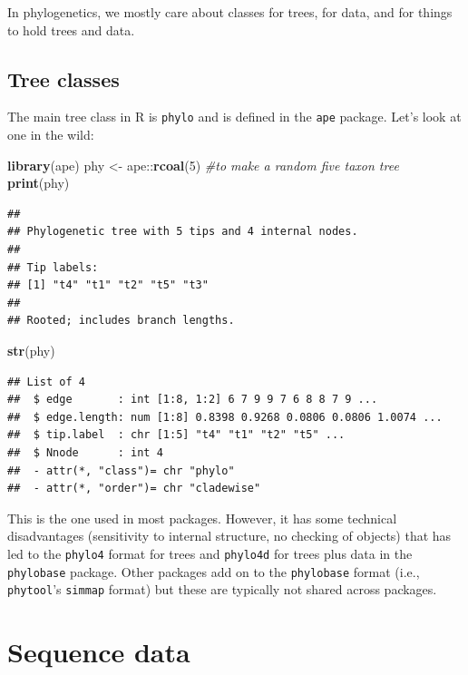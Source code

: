 \documentclass[]{book}
\newenvironment{Shaded}{\begin{snugshade}}{\end{snugshade}}
\newcommand{\KeywordTok}[1]{\textcolor[rgb]{0.13,0.29,0.53}{\textbf{{#1}}}}
\newcommand{\DecValTok}[1]{\textcolor[rgb]{0.00,0.00,0.81}{{#1}}}
\newcommand{\StringTok}[1]{\textcolor[rgb]{0.31,0.60,0.02}{{#1}}}
\newcommand{\CommentTok}[1]{\textcolor[rgb]{0.56,0.35,0.01}{\textit{{#1}}}}
\newcommand{\NormalTok}[1]{{#1}}
\theoremstyle{definition}
\theoremstyle{definition}
\theoremstyle{remark}
\begin{document}
In phylogenetics, we mostly care about classes for trees, for data, and
for things to hold trees and data.

\subsection{Tree classes}\label{tree-classes}

The main tree class in R is \texttt{phylo} and is defined in the
\texttt{ape} package. Let's look at one in the wild:

\begin{Shaded}
\begin{Highlighting}[]
\KeywordTok{library}\NormalTok{(ape)}
\NormalTok{phy <-}\StringTok{ }\NormalTok{ape::}\KeywordTok{rcoal}\NormalTok{(}\DecValTok{5}\NormalTok{) }\CommentTok{#to make a random five taxon tree}
\KeywordTok{print}\NormalTok{(phy)}
\end{Highlighting}
\end{Shaded}

\begin{verbatim}
## 
## Phylogenetic tree with 5 tips and 4 internal nodes.
## 
## Tip labels:
## [1] "t4" "t1" "t2" "t5" "t3"
## 
## Rooted; includes branch lengths.
\end{verbatim}

\begin{Shaded}
\begin{Highlighting}[]
\KeywordTok{str}\NormalTok{(phy)}
\end{Highlighting}
\end{Shaded}

\begin{verbatim}
## List of 4
##  $ edge       : int [1:8, 1:2] 6 7 9 9 7 6 8 8 7 9 ...
##  $ edge.length: num [1:8] 0.8398 0.9268 0.0806 0.0806 1.0074 ...
##  $ tip.label  : chr [1:5] "t4" "t1" "t2" "t5" ...
##  $ Nnode      : int 4
##  - attr(*, "class")= chr "phylo"
##  - attr(*, "order")= chr "cladewise"
\end{verbatim}

This is the one used in most packages. However, it has some technical
disadvantages (sensitivity to internal structure, no checking of
objects) that has led to the \texttt{phylo4} format for trees and
\texttt{phylo4d} for trees plus data in the \texttt{phylobase} package.
Other packages add on to the \texttt{phylobase} format (i.e.,
\texttt{phytool}'s \texttt{simmap} format) but these are typically not
shared across packages.

\section{Sequence data}\label{sequence-data}
\end{document}

